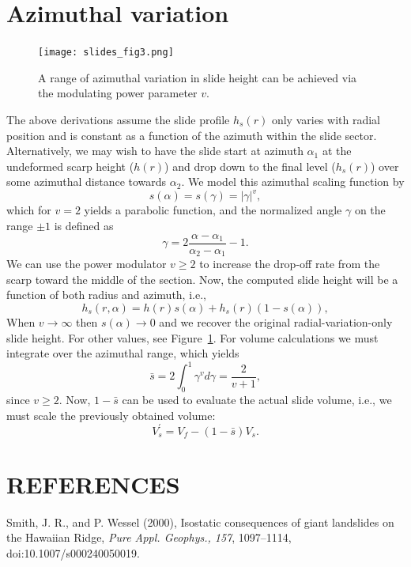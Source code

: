 \documentclass[12pt,letterpaper,margin=0.5in]{report}
\begin{document}
\section{Azimuthal variation}

\begin{figure}[h!]
  \centering
  \texttt{[image: slides\_fig3.png]}
  \caption{A range of azimuthal variation in slide height can be achieved via the modulating power parameter $v$.}
  \label{slides_fig3}
\end{figure}

The above derivations assume the slide profile $h_s(r)$ only varies with radial position and is constant as a function of the azimuth within the slide sector.
Alternatively, we may wish to have the slide start at azimuth $\alpha_1$ at the undeformed scarp height ($h(r)$) and drop down to the final level ($h_s(r)$)
over some azimuthal distance towards $\alpha_2$.  We model this azimuthal scaling function by
\begin{equation}
s(\alpha) = s(\gamma) = \left |\gamma\right|^v,
\end{equation}
which for $v = 2$ yields a parabolic function, and the normalized angle $\gamma$ on the range $\pm1$ is defined as
\begin{equation}
\gamma = 2\frac{\alpha - \alpha_1}{\alpha_2 - \alpha_1} - 1.
\end{equation}
We can use the power modulator $v \ge 2$ to increase the drop-off rate from the scarp toward the middle of the section. Now, the computed slide height will be a function
of both radius and azimuth, i.e.,
\begin{equation}
h_s(r, \alpha) = h(r) s(\alpha) + h_s(r) (1 - s(\alpha)),
\end{equation}
When $v \rightarrow \infty$ then $s(\alpha) \rightarrow 0$ and we recover the original radial-variation-only slide height. For other values,
see Figure~\ref{slides_fig3}.
For volume calculations we must integrate over the azimuthal range, which yields
\begin{equation}
\bar{s} = 2\int_0^1  \gamma^v d\gamma = \frac{2}{v+1},
\end{equation}
since $v \ge 2$. Now, $1 - \bar{s}$ can be used to evaluate the actual slide volume, i.e., we must scale the previously obtained volume:
\begin{equation}
V_s^' = V_f - (1 - \bar{s}) V_s.
\end{equation}

\section{REFERENCES}

Smith, J. R., and P. Wessel (2000), Isostatic consequences of giant landslides on the Hawaiian Ridge,
{\it Pure Appl. Geophys., 157}, 1097--1114, doi:10.1007/s000240050019.
\end{document}
